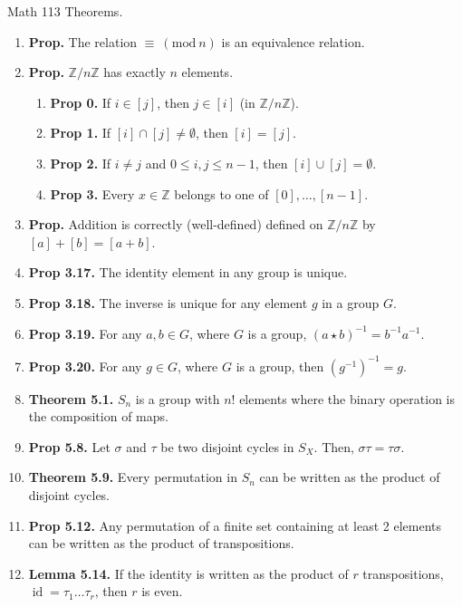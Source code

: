 \documentclass[12pt]{article}
\theoremstyle{definition}
\theoremstyle{named}
\DeclareMathOperator{\id}{id}
\newcommand{\Mod}[1]{\ (\mathrm{mod}\ #1)}
\begin{document}
\begin{center}
    Math 113 Theorems. 
\end{center}

\begin{enumerate}
    \item \textbf{Prop. } The relation $\equiv \Mod{n}$ is an equivalence relation. 
    \item \textbf{Prop. } $\mathbb{Z}/n\mathbb{Z}$ has exactly $n$ elements. 
    \begin{enumerate}
        \item \textbf{Prop 0. } If $i \in [j]$, then $j \in [i]$ (in $\mathbb{Z}/n\mathbb{Z}$). 
        \item \textbf{Prop 1. } If $[i] \cap [j] \neq \emptyset$, then $[i]=[j]$. 
        \item \textbf{Prop 2. } If $i \neq j$ and $0 \leq i,j \leq n-1$, then $[i]\cup[j] = \emptyset$. 
        \item \textbf{Prop 3. } Every $x \in \mathbb{Z}$ belongs to one of $[0],\dots,[n-1]$. 
    \end{enumerate}
	\item \textbf{Prop. } Addition is correctly (well-defined) defined on $\mathbb{Z}/n\mathbb{Z}$ by $[a] + [b] = [a+b]$.
	\item \textbf{Prop 3.17. } The identity element in any group is unique. 
	\item \textbf{Prop 3.18. } The inverse is unique for any element $g$ in a group $G$. 
	\item \textbf{Prop 3.19. } For any $a,b \in G$, where $G$ is a group, $(a \star b)^{-1} = b^{-1}a^{-1}$. 
	\item \textbf{Prop 3.20. } For any $g \in G$, where $G$ is a group, then $(g^{-1})^{-1} = g$. 
	\item \textbf{Theorem 5.1. } $S_n$ is a group with $n!$ elements where the binary operation is the composition of maps. 
	\item \textbf{Prop 5.8. } Let $\sigma$ and $\tau$ be two disjoint cycles in $S_X$. Then, $\sigma\tau = \tau\sigma$. 
	\item \textbf{Theorem 5.9. } Every permutation in $S_n$ can be written as the product of disjoint cycles. 
	\item \textbf{Prop 5.12. } Any permutation of a finite set containing at least 2 elements can be written as the product of transpositions. 
	\item \textbf{Lemma 5.14. } If the identity is written as the product of $r$ transpositions, $\id = \tau_1\dots\tau_r$, then $r$ is even. 

\end{enumerate}
\end{document}
